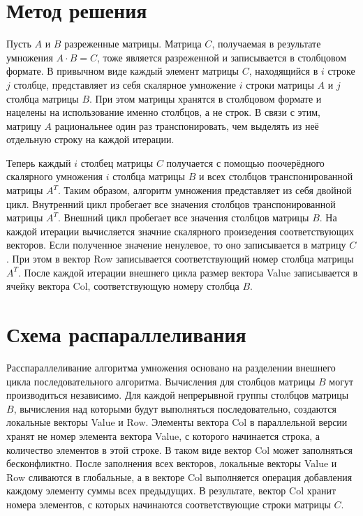 \documentclass{report}
\begin{document}
\section*{Метод решения}
Пусть $A$ и $B$ разреженные матрицы. Матрица $C$, получаемая в результате умножения $A\cdot B = C$, тоже является разреженной и записывается в столбцовом формате. В привычном виде каждый элемент матрицы $C$, находящийся в $i$ строке $j$ столбце, представляет из себя скалярное умножение $i$ строки матрицы $A$ и $j$ столбца матрицы $B$. При этом матрицы хранятся в столбцовом формате и нацелены на использование именно столбцов, а не строк. В связи с этим, матрицу $A$ рациональнее один раз транспонировать, чем выделять из неё отдельную строку на каждой итерации.
\par Теперь каждый $i$ столбец матрицы $C$ получается с помощью поочерёдного скалярного умножения $i$ столбца матрицы $B$ и всех столбцов транспонированной матрицы $A^T$. Таким образом, алгоритм умножения представляет из себя двойной цикл. Внутренний цикл пробегает все значения столбцов транспонированной матрицы $A^T$. Внешний цикл пробегает все значения столбцов матрицы $B$. На каждой итерации вычисляется значние скалярного произедения соответствующих векторов. Если полученное значение ненулевое, то оно записывается в матрицу $C$. При этом в вектор Row записывается соответствующий номер столбца матрицы $A^T$. После каждой итерации внешнего цикла размер вектора Value записывается в ячейку вектора Col, соответствующую номеру столбца $B$.
\newpage


\section*{Схема распараллеливания}
Расспараллеливание алгоритма умножения основано на разделении внешнего цикла последовательного алгоритма. Вычисления для столбцов матрицы $B$ могут производиться независимо. Для каждой непрерывной группы столбцов матрицы $B$, вычисления над которыми будут выполняться последовательно, создаются локальные векторы Value и Row. Элементы вектора Col в параллельной версии хранят не номер элемента вектора Value, с которого начинается строка, а количество элементов в этой строке. В таком виде вектор Col может заполняться бесконфликтно. После заполнения всех векторов, локальные векторы Value и Row сливаются в глобальные, а в векторе Col выполняется операция добавления каждому элементу суммы всех предыдущих. В результате, вектор Col хранит номера элементов, с которых начинаются соответствующие строки матрицы $C$.
\newpage
\end{document}
